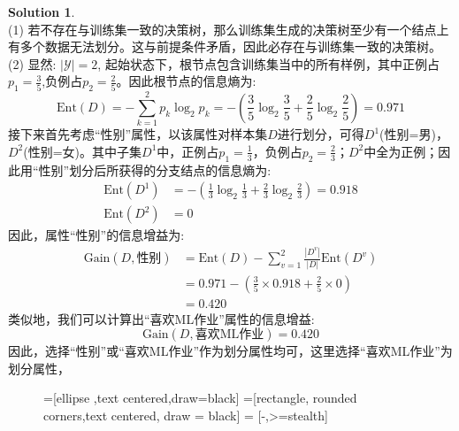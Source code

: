 \documentclass[a4paper,UTF8]{article}
\theoremstyle{definition}
\newtheorem*{solution}{Solution}
\begin{document}
\begin{solution}
~\\(1) 若不存在与训练集一致的决策树，那么训练集生成的决策树至少有一个结点上有多个数据无法划分。这与前提条件矛盾，因此必存在与训练集一致的决策树。
\\(2) 显然: $|\mathcal{Y}| = 2$, 起始状态下，根节点包含训练集当中的所有样例，其中正例占$p_1=\frac{3}{5}$,负例占$p_2=\frac{2}{5}$。因此根节点的信息熵为:
$$\text{Ent}(D) = -\sum_{k=1}^{2}p_k\log_2p_k = -\left(\frac{3}{5}\log_2{\frac{3}{5}} + \frac{2}{5}\log_2{\frac{2}{5}}\right) = 0.971$$
接下来首先考虑“性别”属性，以该属性对样本集$D$进行划分，可得$D^1$(性别=男)，$D^2$(性别=女)。其中子集$D^1$中，正例占$p_1=\frac{1}{3}$，负例占$p_2=\frac{2}{3}$；$D^2$中全为正例；因此用“性别”划分后所获得的分支结点的信息熵为:
\begin{equation}\nonumber
\begin{aligned}
\text{Ent}(D^1) &= -\left(\frac{1}{3}\log_2{\frac{1}{3}} + \frac{2}{3}\log_2{\frac{2}{3}}\right) = 0.918\\\text{Ent}(D^2) &= 0
\end{aligned}
\end{equation}
因此，属性“性别”的信息增益为:
\begin{equation}\nonumber
\begin{aligned}
\text{Gain}(D,\text{性别}) &= \text{Ent}(D) - \sum_{v=1}^{2} \frac{|D^v|}{|D|}\text{Ent}(D^v) \\&= 0.971 - (\frac{3}{5}\times 0.918 + \frac{2}{5}\times 0) \\&= 0.420
\end{aligned}
\end{equation}
类似地，我们可以计算出“喜欢ML作业”属性的信息增益:
$$\text{Gain}(D,\text{喜欢ML作业}) = 0.420$$
因此，选择“性别”或“喜欢ML作业”作为划分属性均可，这里选择“喜欢ML作业”为划分属性，
\begin{figure}[htbp]
\centering
=[ellipse ,text centered,draw=black]
 =[rectangle, rounded corners,text centered, draw = black]
 = [-,>=stealth]
\end{figure}
\end{solution}
\end{document}
